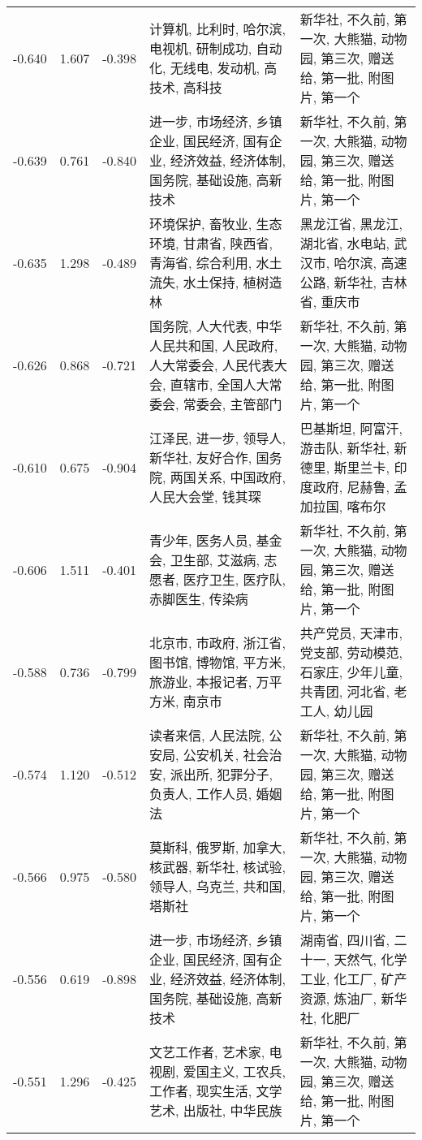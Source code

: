 \begin{tabular}{cccp{5cm}p{5cm}}
-0.640 & 1.607 & -0.398 & 计算机, 比利时, 哈尔滨, 电视机, 研制成功, 自动化, 无线电, 发动机, 高技术, 高科技 & 新华社, 不久前, 第一次, 大熊猫, 动物园, 第三次, 赠送给, 第一批, 附图片, 第一个 \\
-0.639 & 0.761 & -0.840 & 进一步, 市场经济, 乡镇企业, 国民经济, 国有企业, 经济效益, 经济体制, 国务院, 基础设施, 高新技术 & 新华社, 不久前, 第一次, 大熊猫, 动物园, 第三次, 赠送给, 第一批, 附图片, 第一个 \\
-0.635 & 1.298 & -0.489 & 环境保护, 畜牧业, 生态环境, 甘肃省, 陕西省, 青海省, 综合利用, 水土流失, 水土保持, 植树造林 & 黑龙江省, 黑龙江, 湖北省, 水电站, 武汉市, 哈尔滨, 高速公路, 新华社, 吉林省, 重庆市 \\
-0.626 & 0.868 & -0.721 & 国务院, 人大代表, 中华人民共和国, 人民政府, 人大常委会, 人民代表大会, 直辖市, 全国人大常委会, 常委会, 主管部门 & 新华社, 不久前, 第一次, 大熊猫, 动物园, 第三次, 赠送给, 第一批, 附图片, 第一个 \\
-0.610 & 0.675 & -0.904 & 江泽民, 进一步, 领导人, 新华社, 友好合作, 国务院, 两国关系, 中国政府, 人民大会堂, 钱其琛 & 巴基斯坦, 阿富汗, 游击队, 新华社, 新德里, 斯里兰卡, 印度政府, 尼赫鲁, 孟加拉国, 喀布尔 \\
-0.606 & 1.511 & -0.401 & 青少年, 医务人员, 基金会, 卫生部, 艾滋病, 志愿者, 医疗卫生, 医疗队, 赤脚医生, 传染病 & 新华社, 不久前, 第一次, 大熊猫, 动物园, 第三次, 赠送给, 第一批, 附图片, 第一个 \\
-0.588 & 0.736 & -0.799 & 北京市, 市政府, 浙江省, 图书馆, 博物馆, 平方米, 旅游业, 本报记者, 万平方米, 南京市 & 共产党员, 天津市, 党支部, 劳动模范, 石家庄, 少年儿童, 共青团, 河北省, 老工人, 幼儿园 \\
-0.574 & 1.120 & -0.512 & 读者来信, 人民法院, 公安局, 公安机关, 社会治安, 派出所, 犯罪分子, 负责人, 工作人员, 婚姻法 & 新华社, 不久前, 第一次, 大熊猫, 动物园, 第三次, 赠送给, 第一批, 附图片, 第一个 \\
-0.566 & 0.975 & -0.580 & 莫斯科, 俄罗斯, 加拿大, 核武器, 新华社, 核试验, 领导人, 乌克兰, 共和国, 塔斯社 & 新华社, 不久前, 第一次, 大熊猫, 动物园, 第三次, 赠送给, 第一批, 附图片, 第一个 \\
-0.556 & 0.619 & -0.898 & 进一步, 市场经济, 乡镇企业, 国民经济, 国有企业, 经济效益, 经济体制, 国务院, 基础设施, 高新技术 & 湖南省, 四川省, 二十一, 天然气, 化学工业, 化工厂, 矿产资源, 炼油厂, 新华社, 化肥厂 \\
-0.551 & 1.296 & -0.425 & 文艺工作者, 艺术家, 电视剧, 爱国主义, 工农兵, 工作者, 现实生活, 文学艺术, 出版社, 中华民族 & 新华社, 不久前, 第一次, 大熊猫, 动物园, 第三次, 赠送给, 第一批, 附图片, 第一个 \\

\end{tabular}
